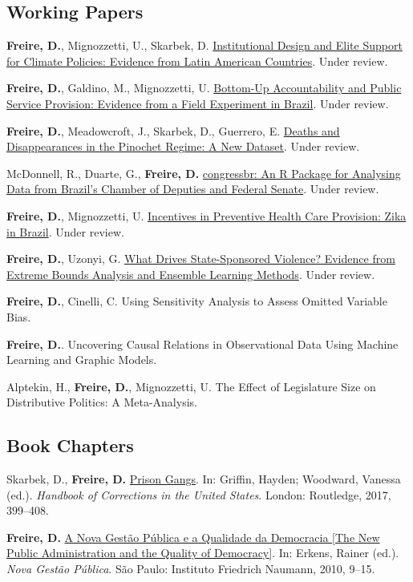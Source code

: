 \documentclass[a4paper]{article}
\renewenvironment{itemize}{
	\begin{list}{}{
			\setlength{\leftmargin}{1.5em}
		}
		}{
	\end{list}
}
\begin{document}
	\subsection*{Working Papers}

	\begin{itemize}
		\item \textbf{Freire, D.}, Mignozzetti, U., Skarbek, D. \href{https://doi.org/10.31235/osf.io/9a6ch}{Institutional Design and Elite Support for Climate Policies: Evidence from Latin American Countries}. Under review.
		\item \textbf{Freire, D.}, Galdino, M., Mignozzetti, U. \href{https://github.com/umbertomig/TDPImpactEval}{Bottom-Up Accountability and Public Service Provision: Evidence from a Field Experiment in Brazil}. Under review.
		\item \textbf{Freire, D.}, Meadowcroft, J., Skarbek, D., Guerrero, E. \href{https://github.com/danilofreire/pinochet}{Deaths and Disappearances in the Pinochet Regime: A New Dataset}. Under review. 
		\item McDonnell, R., Duarte, G., \textbf{Freire, D.} \href{https://osf.io/n5jd8}{congressbr: An R Package for Analysing Data from Brazil's Chamber of Deputies and Federal Senate}. Under review.
		\item \textbf{Freire, D.}, Mignozzetti, U. \href{https://github.com/danilofreire/zika}{Incentives in Preventive Health Care Provision: Zika in Brazil}. Under review.
		\item \textbf{Freire, D.}, Uzonyi, G. \href{https://osf.io/pzx3q}{What Drives State-Sponsored Violence? Evidence from Extreme Bounds Analysis and Ensemble Learning Methods}. Under review.
		\item \textbf{Freire, D.}, Cinelli, C. Using Sensitivity Analysis to Assess Omitted Variable Bias.
		\item \textbf{Freire, D.}. Uncovering Causal Relations in Observational Data Using Machine Learning and Graphic Models.
		\item Alptekin, H., \textbf{Freire, D.}, Mignozzetti, U. The Effect of Legislature Size on Distributive Politics: A Meta-Analysis.
	\end{itemize}

	\subsection*{Book Chapters}

	\begin{itemize}
		\item Skarbek, D., \textbf{Freire, D.} \href{https://osf.io/kuqqx/}{Prison Gangs}. In: Griffin, Hayden; Woodward, Vanessa (ed.). \textit{Handbook of Corrections in the United States}. London: Routledge, 2017, 399--408.
		\item \textbf{Freire, D.} \href{https://fnst.org/sites/default/files/uploads/2017/12/08/ngp.pdf}{A Nova Gest\~{a}o P\'{u}blica e a Qualidade da Democracia {[}The New Public Administration and the Quality of Democracy{]}}. In: Erkens, Rainer (ed.). \textit{Nova Gest\~{a}o P\'{u}blica}. S\~{a}o Paulo: Instituto Friedrich Naumann, 2010, 9--15.
	\end{itemize}
\end{document}
